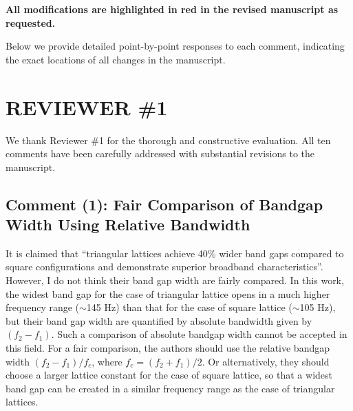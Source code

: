 \documentclass[11pt,a4paper]{article}
\newenvironment{reviewerbox}{%
    \par\medskip\noindent{\color{reviewercolor}\rule{\linewidth}{2pt}}\par
    \noindent{\color{reviewercolor}\bfseries Reviewer Comment}\par\smallskip
}{%
    \par\noindent{\color{reviewercolor}\rule{\linewidth}{0.5pt}}\medskip
}
\begin{document}
\textbf{All modifications are highlighted in \textcolor{redtext}{red} in the revised manuscript as requested.}

Below we provide detailed point-by-point responses to each comment, indicating the exact locations of all changes in the manuscript.

\newpage

\section*{REVIEWER \#1}

We thank Reviewer \#1 for the thorough and constructive evaluation. All ten comments have been carefully addressed with substantial revisions to the manuscript.

\subsection*{Comment (1): Fair Comparison of Bandgap Width Using Relative Bandwidth}

\begin{reviewerbox}
It is claimed that ``triangular lattices achieve 40\% wider band gaps compared to square configurations and demonstrate superior broadband characteristics''. However, I do not think their band gap width are fairly compared. In this work, the widest band gap for the case of triangular lattice opens in a much higher frequency range ($\sim$145 Hz) than that for the case of square lattice ($\sim$105 Hz), but their band gap width are quantified by absolute bandwidth given by $(f_2-f_1)$. Such a comparison of absolute bandgap width cannot be accepted in this field. For a fair comparison, the authors should use the relative bandgap width $(f_2-f_1)/f_c$, where $f_c=(f_2+f_1)/2$. Or alternatively, they should choose a larger lattice constant for the case of square lattice, so that a widest band gap can be created in a similar frequency range as the case of triangular lattices.
\end{reviewerbox}
\end{document}
